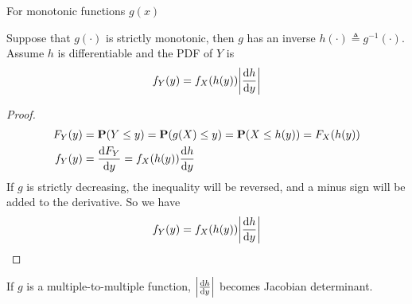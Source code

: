 \documentclass[device=normal, lang=en]{elegantbook}
\numberwithin{equation}{section}
\begin{document}
For monotonic functions $g(x)$
\begin{theorem}
    Suppose that $g(\cdot)$ is strictly monotonic, then $g$ has an inverse $h(\cdot) \triangleq g^{-1}(\cdot)$. Assume $h$ is differentiable and the PDF of $Y$ is
    \begin{equation}
        f_{Y}(y) = f_{X}(h(y)) \abs{\dv{h}{y}}
    \end{equation}
\end{theorem}
\begin{proof}
    \begin{align}
        F_{Y}(y) &= \mathbf{P}(Y \leq y) = \mathbf{P}(g(X) \leq y) = \mathbf{P}(X \leq h(y)) = F_{X}(h(y)) \\ 
        f_{Y}(y) &= \dv{F_{Y}}{y} = f_{X}(h(y)) \dv{h}{y}
    \end{align}
    If $g$ is strictly decreasing, the inequality will be reversed, and a minus sign will be added to the derivative. So we have
    \begin{equation}
        f_{Y}(y) = f_{X}(h(y)) \abs{\dv{h}{y}}
    \end{equation}
\end{proof}
\begin{remark}
    If $g$ is a multiple-to-multiple function, $\abs{\dv{h}{y}}$ becomes Jacobian determinant.
\end{remark}
\end{document}
